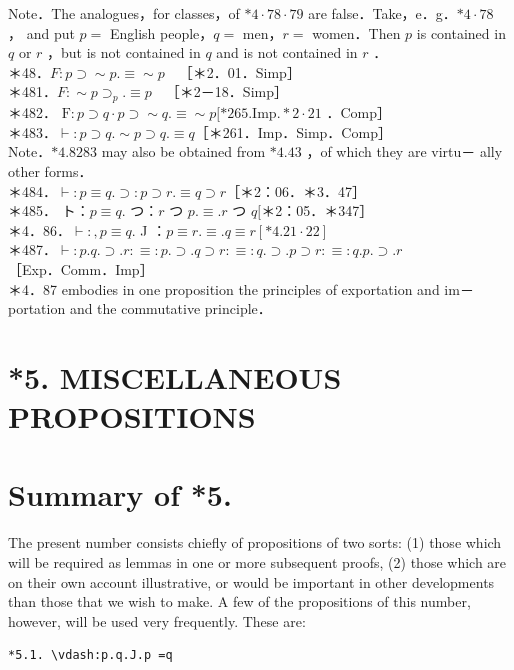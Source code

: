 \documentclass[10pt]{article}
\begin{document}
Note．The analogues，for classes，of $* 4 \cdot 78 \cdot 79$ are false．Take，e．g．$* 4 \cdot 78$ ， and put $p=$ English people，$q=$ men，$r=$ women．Then $p$ is contained in $q$ or $r$ ，but is not contained in $q$ and is not contained in $r$ ．\\
＊48．$F: p \supset \sim p . \equiv \sim p \quad$［＊2．01．Simp］\\
＊481．$F: \sim p \supset_{p} . \equiv p \quad$［＊2－18．Simp］\\
＊482． $\mathrm{F}: p \supset q \cdot p \supset \sim q . \equiv \sim p[* 265 . \mathrm{Imp} . * 2 \cdot 21$ ．Comp］\\
＊483．$\vdash: p \supset q . \sim p \supset q . \equiv q$［＊261．Imp．Simp．Comp］\\
Note．$* 4.8283$ may also be obtained from $* 4.43$ ，of which they are virtu－ ally other forms．\\
＊484．$\vdash: p \equiv q . \supset: p \supset r . \equiv q \supset r$［＊2：06．＊3．47］\\
＊485． ト：$p \equiv q$. つ：$r$ つ $p . \equiv . r$ つ $q[$＊2：05．＊347］\\
＊4．86．$\vdash:, p \equiv q$. J ：$p \equiv r . \equiv . q \equiv r[* 4.21 \cdot 22]$\\
＊487．$\vdash: p . q . \supset . r: \equiv: p . \supset . q \supset r: \equiv: q . \supset . p \supset r: \equiv: q . p . \supset . r$\\
［Exp．Comm．Imp］\\
＊4．87 embodies in one proposition the principles of exportation and im－ portation and the commutative principle．

\section*{*5. MISCELLANEOUS PROPOSITIONS}
\section*{Summary of *5.}
The present number consists chiefly of propositions of two sorts: (1) those which will be required as lemmas in one or more subsequent proofs, (2) those which are on their own account illustrative, or would be important in other developments than those that we wish to make. A few of the propositions of this number, however, will be used very frequently. These are:

\begin{verbatim}
*5.1. \vdash:p.q.J.p =q
\end{verbatim}
\end{document}
